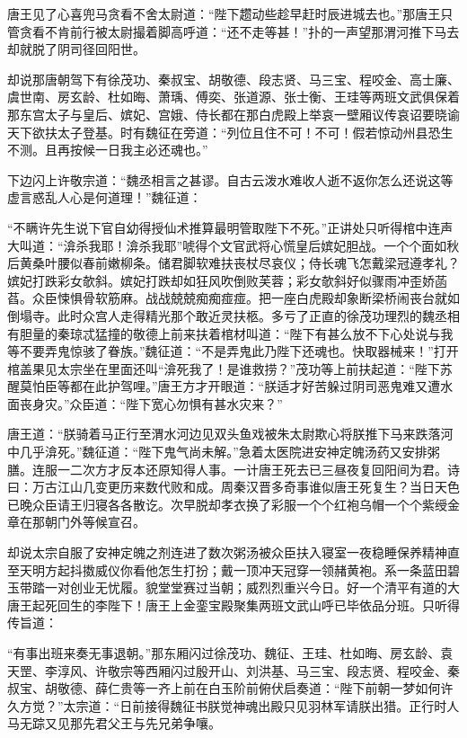 \documentclass[12pt,UTF8]{ctexbook}
\begin{document}
{唐王见了心喜兜马贪看不舍太尉道：“陛下趱动些趁早赶时辰进城去也。”那唐王只管贪看不肯前行被太尉撮着脚高呼道：“还不走等甚！”扑的一声望那渭河推下马去却就脱了阴司径回阳世。

却说那唐朝驾下有徐茂功、秦叔宝、胡敬德、段志贤、马三宝、程咬金、高士廉、虞世南、房玄龄、杜如晦、萧瑀、傅奕、张道源、张士衡、王珪等两班文武俱保着那东宫太子与皇后、嫔妃、宫娥、侍长都在那白虎殿上举哀一壁厢议传哀诏要晓谕天下欲扶太子登基。时有魏征在旁道：“列位且住不可！不可！假若惊动州县恐生不测。且再按候一日我主必还魂也。”

下边闪上许敬宗道：“魏丞相言之甚谬。自古云泼水难收人逝不返你怎么还说这等虚言惑乱人心是何道理！”魏征道：

“不瞒许先生说下官自幼得授仙术推算最明管取陛下不死。”正讲处只听得棺中连声大叫道：“渰杀我耶！渰杀我耶”唬得个文官武将心慌皇后嫔妃胆战。一个个面如秋后黄桑叶腰似春前嫩柳条。储君脚软难扶丧杖尽哀仪；侍长魂飞怎戴梁冠遵孝礼？嫔妃打跌彩女欹斜。嫔妃打跌却如狂风吹倒败芙蓉；彩女欹斜好似骤雨冲歪娇菡萏。众臣悚惧骨软筋麻。战战兢兢痴痴痖痖。把一座白虎殿却象断梁桥闹丧台就如倒塌寺。此时众宫人走得精光那个敢近灵扶柩。多亏了正直的徐茂功理烈的魏丞相有胆量的秦琼忒猛撞的敬德上前来扶着棺材叫道：“陛下有甚么放不下心处说与我等不要弄鬼惊骇了眷族。”魏征道：“不是弄鬼此乃陛下还魂也。快取器械来！”打开棺盖果见太宗坐在里面还叫“渰死我了！是谁救捞？”茂功等上前扶起道：“陛下苏醒莫怕臣等都在此护驾哩。”唐王方才开眼道：“朕适才好苦躲过阴司恶鬼难又遭水面丧身灾。”众臣道：“陛下宽心勿惧有甚水灾来？”

唐王道：“朕骑着马正行至渭水河边见双头鱼戏被朱太尉欺心将朕推下马来跌落河中几乎渰死。”魏征道：“陛下鬼气尚未解。”急着太医院进安神定魄汤药又安排粥膳。连服一二次方才反本还原知得人事。一计唐王死去已三昼夜复回阳间为君。诗曰：万古江山几变更历来数代败和成。周秦汉晋多奇事谁似唐王死复生？当日天色已晚众臣请王归寝各各散讫。次早脱却孝衣换了彩服一个个红袍乌帽一个个紫绶金章在那朝门外等候宣召。

却说太宗自服了安神定魄之剂连进了数次粥汤被众臣扶入寝室一夜稳睡保养精神直至天明方起抖擞威仪你看他怎生打扮；戴一顶冲天冠穿一领赭黄袍。系一条蓝田碧玉带踏一对创业无忧履。貌堂堂赛过当朝；威烈烈重兴今日。好一个清平有道的大唐王起死回生的李陛下！唐王上金銮宝殿聚集两班文武山呼已毕依品分班。只听得传旨道：

“有事出班来奏无事退朝。”那东厢闪过徐茂功、魏征、王珪、杜如晦、房玄龄、袁天罡、李淳风、许敬宗等西厢闪过殷开山、刘洪基、马三宝、段志贤、程咬金、秦叔宝、胡敬德、薛仁贵等一齐上前在白玉阶前俯伏启奏道：“陛下前朝一梦如何许久方觉？”太宗道：“日前接得魏征书朕觉神魂出殿只见羽林军请朕出猎。正行时人马无踪又见那先君父王与先兄弟争嚷。

}
\end{document}
